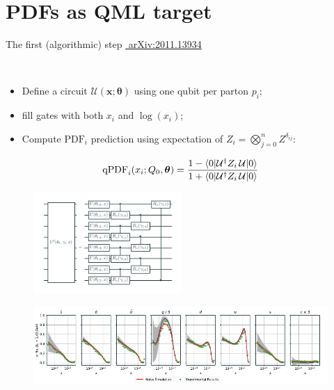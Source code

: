 \documentclass[8pt, xcolor={svgnames}, hyperref={linkcolor=black}]{beamer}
\begin{document}
\section{PDFs as QML target}
\begin{frame}{The first (algorithmic) step \hfill \href{https://arxiv.org/abs/2011.13934}{\faBook\,\,arXiv:2011.13934}}
\pause
\begin{multicols}{2}
$\,$
\begin{itemize}[noitemsep]
  \item[\footnotesize\faCircle] Define a circuit $\mathcal{U}(\bm{x};\bm{\theta})$ using one qubit per parton $p_i$;
  \item[\footnotesize\faCircle] fill gates with both $x_i$ and $\log(x_i)$;
  \item[\footnotesize\faCircle] Compute $\text{PDF}_i$ prediction using expectation of $Z_i = \bigotimes_{j=0}^n Z^{\delta_{ij}}:$
\end{itemize}
$$ \text{qPDF}_i(x_i; Q_0, \bm{\theta}) = \frac{1 - \braket{0|\mathcal{U}^{\dagger} Z_i \,
\mathcal{U}| 0}}{1 + \braket{0|\mathcal{U}^{\dagger} Z_i\, \mathcal{U}| 0}}  $$
\begin{figure}  
  \includegraphics[width=0.5\textwidth]{figures/qpdf_circuit.pdf}
\end{figure}
\end{multicols}
\pause
\begin{figure}  
  \includegraphics[width=1\textwidth]{figures/qpdf.pdf}
\end{figure}
\end{frame}
\end{document}
